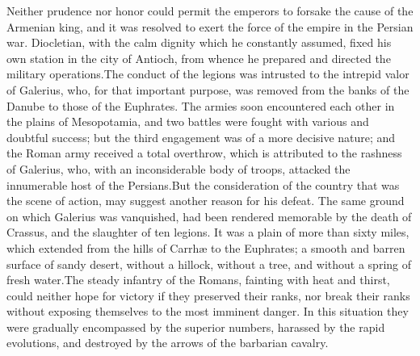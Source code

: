 


Neither prudence nor honor could permit the emperors to forsake
the cause of the Armenian king, and it was resolved to exert the
force of the empire in the Persian war. Diocletian, with the calm
dignity which he constantly assumed, fixed his own station in the
city of Antioch, from whence he prepared and directed the
military operations.\footnotemark[63] The conduct of the legions was intrusted
to the intrepid valor of Galerius, who, for that important
purpose, was removed from the banks of the Danube to those of the
Euphrates. The armies soon encountered each other in the plains
of Mesopotamia, and two battles were fought with various and
doubtful success; but the third engagement was of a more decisive
nature; and the Roman army received a total overthrow, which is
attributed to the rashness of Galerius, who, with an
inconsiderable body of troops, attacked the innumerable host of
the Persians.\footnotemark[64] But the consideration of the country that was
the scene of action, may suggest another reason for his defeat.
The same ground on which Galerius was vanquished, had been
rendered memorable by the death of Crassus, and the slaughter of
ten legions. It was a plain of more than sixty miles, which
extended from the hills of Carrhæ to the Euphrates; a smooth and
barren surface of sandy desert, without a hillock, without a
tree, and without a spring of fresh water.\footnotemark[65] The steady infantry
of the Romans, fainting with heat and thirst, could neither hope
for victory if they preserved their ranks, nor break their ranks
without exposing themselves to the most imminent danger. In this
situation they were gradually encompassed by the superior
numbers, harassed by the rapid evolutions, and destroyed by the
arrows of the barbarian cavalry.

